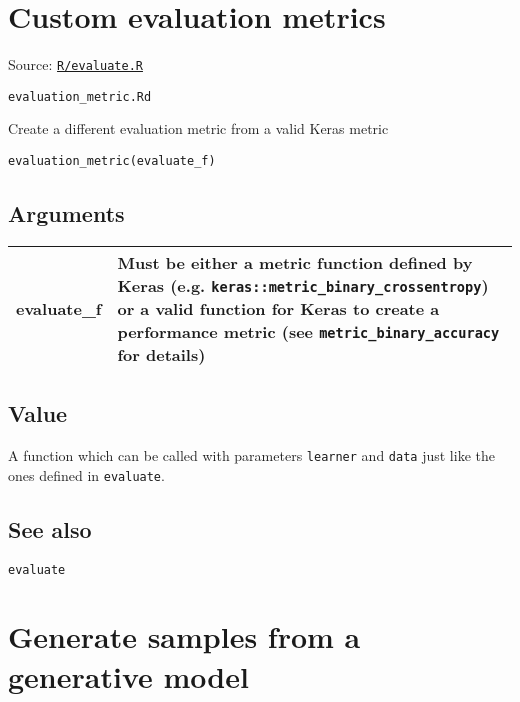 \section{Custom evaluation metrics}\label{custom-evaluation-metrics}

Source:
\href{https://github.com/fdavidcl/ruta/blob/master/R/evaluate.R}{\texttt{R/evaluate.R}}

\texttt{evaluation\_metric.Rd}

Create a different evaluation metric from a valid Keras metric

\begin{verbatim}
evaluation_metric(evaluate_f)
\end{verbatim}

\hypertarget{arguments}{\subsection{\texorpdfstring{\protect\hyperlink{arguments}{}Arguments}{Arguments}}\label{arguments}}

\begin{longtable}[c]{@{}>{\small}p{3cm}>{\raggedright}p{12.5cm}@{}}
\toprule
evaluate\_f & Must be either a metric function defined by Keras (e.g.
\texttt{keras::metric\_binary\_crossentropy}) or a valid function for
Keras to create a performance metric (see
\texttt{metric\_binary\_accuracy} for details)\tabularnewline
\bottomrule
\end{longtable}

\hypertarget{value}{\subsection{\texorpdfstring{\protect\hyperlink{value}{}Value}{Value}}\label{value}}

A function which can be called with parameters \texttt{learner} and
\texttt{data} just like the ones defined in \texttt{evaluate}.

\hypertarget{see-also}{\subsection{\texorpdfstring{\protect\hyperlink{see-also}{}See
also}{See also}}\label{see-also}}

\texttt{evaluate}

\section{Generate samples from a generative
model}\label{generate-samples-from-a-generative-model}

